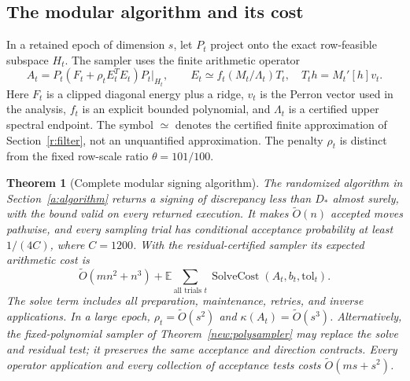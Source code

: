 \documentclass[11pt]{amsart}
\newtheorem{theorem}{Theorem}[section]
\theoremstyle{definition}\newtheorem{definition}[theorem]{Definition}
\theoremstyle{remark}\newtheorem{remark}[theorem]{Remark}
\numberwithin{equation}{section}
\begin{document}
\subsection{The modular algorithm and its cost}
In a retained epoch of dimension $s$, let $P_t$ project onto the exact
row-feasible subspace $H_t$. The sampler uses the finite arithmetic operator
\begin{equation}\label{i:operator}
 A_t=P_t(F_t+\rho_t E_t^TE_t)P_t\big|_{H_t},
 \qquad E_t\simeq f_t(M_t/\Lambda_t)T_t,
 \quad T_th=M_t'[h]v_t.
\end{equation}
Here $F_t$ is a clipped diagonal energy plus a ridge, $v_t$ is the Perron
vector used in the analysis, $f_t$ is an explicit bounded polynomial, and
$\Lambda_t$ is a certified upper spectral endpoint. The symbol $\simeq$
denotes the certified finite approximation of Section~\ref{r:filter},
not an unquantified approximation. The penalty $\rho_t$ is distinct from
the fixed row-scale ratio $\theta=101/100$.

\begin{theorem}[Complete modular signing algorithm]\label{i:modular}
The randomized algorithm in Section~\ref{a:algorithm} returns a signing
of discrepancy less than $D_*$ almost surely, with the bound valid on
every returned execution. It makes $\widetilde O(n)$ accepted moves
pathwise, and every sampling trial has conditional acceptance probability
at least $1/(4C)$, where $C=1200$.
With the residual-certified sampler its expected arithmetic cost is
\begin{equation}\label{i:cost}
 \widetilde O(mn^2+n^3)
 +\mathbb E\sum_{\text{all trials }t}
       \operatorname{SolveCost}(A_t,b_t,\mathrm{tol}_t).
\end{equation}
The solve term includes all preparation, maintenance, retries, and inverse
applications. In a large epoch,
$\rho_t=\widetilde O(s^2)$ and $\kappa(A_t)=\widetilde O(s^3)$.
Alternatively, the fixed-polynomial sampler of
Theorem~\ref{new:polysampler} may replace the solve and residual test;
it preserves the same acceptance and direction contracts.
Every operator application and every collection of acceptance tests costs
$\widetilde O(ms+s^2)$.
\end{theorem}
\end{document}
